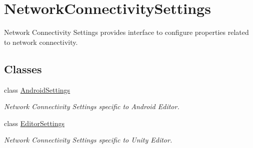 \hypertarget{class_voxel_busters_1_1_native_plugins_1_1_network_connectivity_settings}{}\section{Network\+Connectivity\+Settings}
\label{class_voxel_busters_1_1_native_plugins_1_1_network_connectivity_settings}


Network Connectivity Settings provides interface to configure properties related to network connectivity.  


\subsection*{Classes}
\begin{DoxyCompactItemize}
\item 
class \hyperlink{class_voxel_busters_1_1_native_plugins_1_1_network_connectivity_settings_1_1_android_settings}{Android\+Settings}
\begin{DoxyCompactList}\small\item\em Network Connectivity Settings specific to Android Editor. \end{DoxyCompactList}\item 
class \hyperlink{class_voxel_busters_1_1_native_plugins_1_1_network_connectivity_settings_1_1_editor_settings}{Editor\+Settings}
\begin{DoxyCompactList}\small\item\em Network Connectivity Settings specific to Unity Editor. \end{DoxyCompactList}\end{DoxyCompactItemize}

